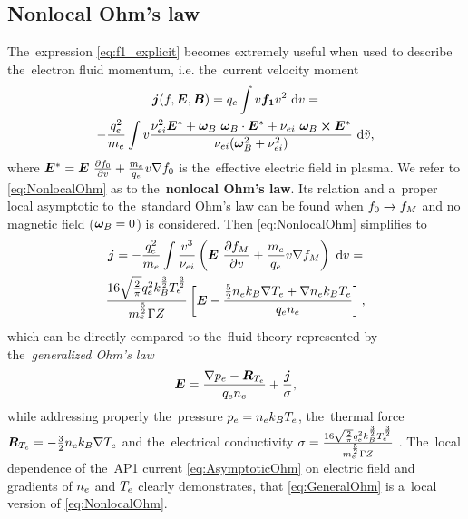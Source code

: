 \subsection{Nonlocal Ohm's law}
\label{sec:Efield}
The~expression \eqref{eq:f1_explicit} becomes extremely useful when used
to describe the~electron fluid momentum, i.e. the~current velocity moment
\begin{multline}
  \boldsymbol{j}(f, \boldsymbol{E}, \boldsymbol{B}) = q_e \int v \boldsymbol{f_1} v^2~\text{d} v = \\
  - \frac{q_e^2}{m_e} \int v \frac{\nu_{ei}^2 \boldsymbol{E}^* 
  + \boldsymbol{\omega}_{B}~\boldsymbol{\omega}_{B}\cdot\boldsymbol{E}^* + \nu_{ei}~\boldsymbol{\omega}_{B} \boldsymbol{\times} \boldsymbol{E}^*}
  {\nu_{ei} (\boldsymbol{\omega}_{B}^2 + \nu_{ei}^2)}~\text{d} \tilde{v} ,
  \label{eq:NonlocalOhm}
\end{multline}
where $\boldsymbol{E}^* = \boldsymbol{E}~\frac{\partial{f_0}}{\partial{v}} + \frac{m_e}{q_e}v \nabla f_0$ 
is the~effective electric field in plasma. We refer to 
\eqref{eq:NonlocalOhm} as to the~{\bf nonlocal Ohm's law}.
Its relation and a~proper local asymptotic to the~standard Ohm's law  
can be found when $f_0\rightarrow f_M$ and no magnetic field ($\boldsymbol{\omega}_{B} = 0$) 
is considered. Then \eqref{eq:NonlocalOhm} simplifies to
\begin{multline}
  \boldsymbol{j} =- \frac{q_e^2}{m_e} \int \frac{v^3}{\nu_{ei}}
  \left( \boldsymbol{E}~\frac{\partial{f_M}}{\partial{v}} + \frac{m_e}{q_e}v \nabla f_M \right)
  ~\text{d} v =\\
  \frac{16\sqrt{\frac{2}{\pi}}q_e^2 k_B^\frac{3}{2} T_e^\frac{3}{2}}{m_e^\frac{5}{2} \Gamma Z}
  \left[\boldsymbol{E} - \frac{\frac{5}{2} n_e k_B \nabla T_e 
  + \nabla n_e k_B T_e}{q_e n_e}  \right] 
  ,
  \label{eq:AsymptoticOhm}
\end{multline}
which can be directly compared to the~fluid theory represented by 
the~\textit{generalized Ohm's law} 
\begin{equation}
  \boldsymbol{E} =  
  \frac{\nabla p_e - \boldsymbol{R}_{T_e}}{q_e n_e}
  + \frac{\boldsymbol{j}}{\sigma}
  ,
  \label{eq:GeneralOhm} 
\end{equation}
while addressing properly  the~pressure $p_e = n_e k_B T_e$,
the~thermal force $\boldsymbol{R}_{T_e} = - \frac{3}{2} n_e k_B \nabla T_e$ 
and the~electrical conductivity 
$\sigma = \frac{16\sqrt{\frac{2}{\pi}}q_e^2 k_B^\frac{3}{2} T_e^\frac{3}{2}}
{m_e^\frac{5}{2} \Gamma Z}$ \cite{Braginskii_1965_3}.
The~local dependence of the~AP1 current \eqref{eq:AsymptoticOhm} 
on electric field and gradients of $n_e$ and $T_e$ clearly demonstrates, 
that \eqref{eq:GeneralOhm} is a~local version of \eqref{eq:NonlocalOhm}.

